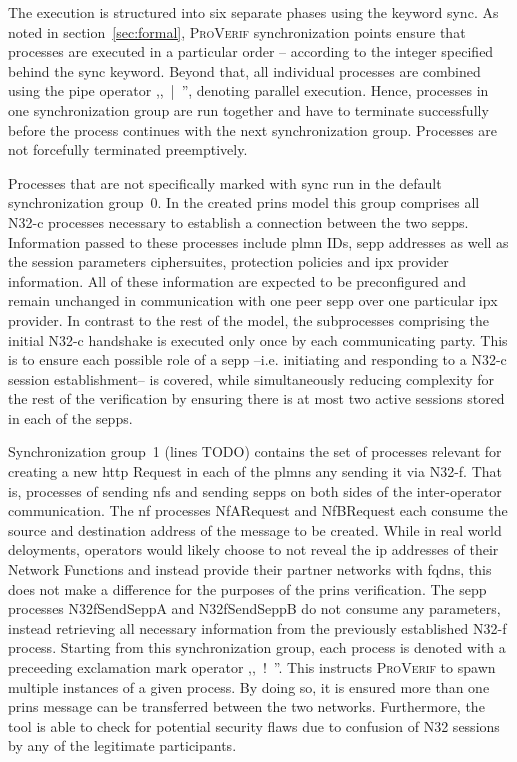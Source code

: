 The execution is structured into six separate phases using the keyword {\sffamily sync}.
As noted in section~\ref{sec:formal}, \textsc{ProVerif} synchronization points ensure that processes are executed in a particular order -- according to the integer specified behind the {\sffamily sync} keyword.
Beyond that, all individual processes are combined using the pipe operator ,,~{\sffamily |}~'', denoting parallel execution.
Hence, processes in one synchronization group are run together and have to terminate successfully before the process continues with the next synchronization group.
Processes are not forcefully terminated preemptively.

Processes that are not specifically marked with {\sffamily sync} run in the default synchronization group~0.
In the created \gls{prins} model this group comprises all N32-c processes necessary to establish a connection between the two \glspl{sepp}.
Information passed to these processes include \gls{plmn} IDs, \gls{sepp} addresses as well as the session parameters ciphersuites, protection policies and \gls{ipx} provider information.
All of these information are expected to be preconfigured and remain unchanged in communication with one peer \gls{sepp} over one particular \gls{ipx} provider.
In contrast to the rest of the model, the subprocesses comprising the initial N32-c handshake is executed only once by each communicating party.
This is to ensure each possible role of a \gls{sepp} --i.e. initiating and responding to a N32-c session establishment-- is covered, while simultaneously reducing complexity for the rest of the verification by ensuring there is at most two active sessions stored in each of the \glspl{sepp}.

Synchronization group~1 (lines TODO) contains the set of processes relevant for creating a new \gls{http} Request in each of the \glspl{plmn} any sending it via N32-f.
That is, processes of sending \glspl{nf} and sending \glspl{sepp} on both sides of the inter-operator communication.
The \gls{nf} processes {\sffamily NfARequest} and {\sffamily NfBRequest} each consume the source and destination address of the message to be created.
While in real world deloyments, operators would likely choose to not reveal the \gls{ip} addresses of their Network Functions and instead provide their partner networks with \glspl{fqdn}, this does not make a difference for the purposes of the \gls{prins} verification.
The \gls{sepp} processes {\sffamily N32fSendSeppA} and {\sffamily N32fSendSeppB} do not consume any parameters, instead retrieving all necessary information from the previously established N32-f process.
Starting from this synchronization group, each process is denoted with a preceeding exclamation mark operator ,,~{\sffamily !}~''.
This instructs \textsc{ProVerif} to spawn multiple instances of a given process.
By doing so, it is ensured more than one \gls{prins} message can be transferred between the two networks.
Furthermore, the tool is able to check for potential security flaws due to confusion of N32 sessions by any of the legitimate participants.

